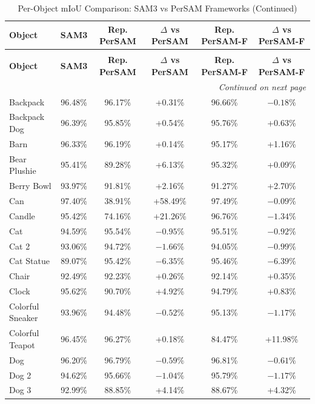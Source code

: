 \documentclass[journal,12pt,onecolumn,draftclsnofoot]{IEEEtran}
\begin{document}
\small
\setlength{\tabcolsep}{4pt}
\begin{longtable}{l c c c c c}
\caption{Per-Object mIoU Comparison: SAM3 vs PerSAM Frameworks} \label{tab:sam3_per_object} \\
\toprule
\textbf{Object} & \textbf{SAM3} & \textbf{Rep. PerSAM} & \textbf{$\Delta$ vs PerSAM} & \textbf{Rep. PerSAM-F} & \textbf{$\Delta$ vs PerSAM-F} \\ \midrule
\endfirsthead
\caption[]{Per-Object mIoU Comparison: SAM3 vs PerSAM Frameworks (Continued)} \\
\toprule
\textbf{Object} & \textbf{SAM3} & \textbf{Rep. PerSAM} & \textbf{$\Delta$ vs PerSAM} & \textbf{Rep. PerSAM-F} & \textbf{$\Delta$ vs PerSAM-F} \\ \midrule
\endhead
\midrule \multicolumn{6}{r}{\textit{Continued on next page}} \\
\endfoot
\bottomrule
\endlastfoot
Backpack & 96.48\% & 96.17\% & +0.31\% & 96.66\% & $-0.18\%$ \\
Backpack Dog & 96.39\% & 95.85\% & +0.54\% & 95.76\% & +0.63\% \\
Barn & 96.33\% & 96.19\% & +0.14\% & 95.17\% & +1.16\% \\
Bear Plushie & 95.41\% & 89.28\% & +6.13\% & 95.32\% & +0.09\% \\
Berry Bowl & 93.97\% & 91.81\% & +2.16\% & 91.27\% & +2.70\% \\
Can & 97.40\% & 38.91\% & +58.49\% & 97.49\% & $-0.09\%$ \\
Candle & 95.42\% & 74.16\% & +21.26\% & 96.76\% & $-1.34\%$ \\
Cat & 94.59\% & 95.54\% & $-0.95\%$ & 95.51\% & $-0.92\%$ \\
Cat 2 & 93.06\% & 94.72\% & $-1.66\%$ & 94.05\% & $-0.99\%$ \\
Cat Statue & 89.07\% & 95.42\% & $-6.35\%$ & 95.46\% & $-6.39\%$ \\
Chair & 92.49\% & 92.23\% & +0.26\% & 92.14\% & +0.35\% \\
Clock & 95.62\% & 90.70\% & +4.92\% & 94.79\% & +0.83\% \\
Colorful Sneaker & 93.96\% & 94.48\% & $-0.52\%$ & 95.13\% & $-1.17\%$ \\
Colorful Teapot & 96.45\% & 96.27\% & +0.18\% & 84.47\% & +11.98\% \\
Dog & 96.20\% & 96.79\% & $-0.59\%$ & 96.81\% & $-0.61\%$ \\
Dog 2 & 94.62\% & 95.66\% & $-1.04\%$ & 95.79\% & $-1.17\%$ \\
Dog 3 & 92.99\% & 88.85\% & +4.14\% & 88.67\% & +4.32\% \\

\end{longtable}
\end{document}
